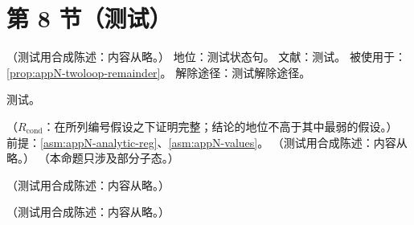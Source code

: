 \section{第 8 节（测试）}\label{sec:appN-status}

\begin{assumption}\label{asm:appN-analytic-reg}
（测试用合成陈述：内容从略。）
地位：测试状态句。
文献：测试。
被使用于：\cref{prop:appN-twoloop-remainder}。
解除途径：测试解除途径。
\end{assumption}
\begin{proofsketch}测试。\end{proofsketch}

\begin{proposition}\label{prop:appN-twoloop-remainder}
（$R_{\mathrm{cond}}$：在所列编号假设之下证明完整；结论的地位不高于其中最弱的假设。）
前提：\cref{asm:appN-analytic-reg}、\cref{asm:appN-values}。
（测试用合成陈述：内容从略。）
（本命题只涉及部分子态。）
\end{proposition}

\begin{remark}\label{rem:appN-m1-infrared}
（测试用合成陈述：内容从略。）
\end{remark}

\begin{remark}\label{rem:appN-fibered-allorders}
（测试用合成陈述：内容从略。）
\end{remark}
